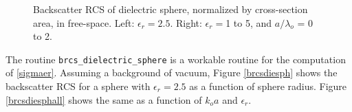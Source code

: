 \begin{figure}[h] 
   \centering
   \caption{Backscatter RCS of dielectric sphere, normalized by cross-section area, in free-space. Left: $\epsilon_r = 2.5$. Right: $\epsilon_r =$1 to 5, and $a/\lambda_o$ = 0 to 2.}
 \end{figure}
%
%
%

The routine \texttt{brcs\_dielectric\_sphere} is a workable routine for the computation of \eqref{sigmaer}.  Assuming a background of vacuum, Figure \ref{brcsdiesph} shows the backscatter RCS for a sphere with $\epsilon_r = 2.5$ as a function of sphere radius. Figure \ref{brcsdiesphall} shows the same as a function of $k_o a$ and $\epsilon_r$. 

